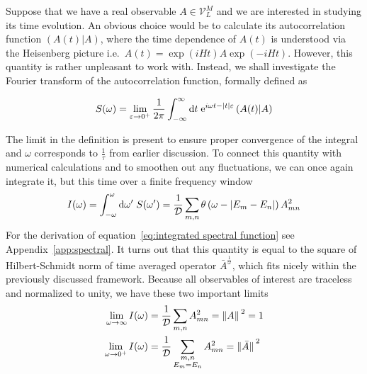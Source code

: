 Suppose that we have a real observable \(A \in \mathcal{V}_L^M\) and we are interested in studying its time
evolution. An obvious choice would be to calculate its autocorrelation function
\((A(t)|A)\), where the time dependence of \(A(t)\) is understood
via the Heisenberg picture i.e.\ \(A(t) = \exp\left(i H t\right) A
\exp\left(-i H t\right)\). However, this quantity is rather unpleasant to work with.
Instead, we shall investigate the Fourier transform of the autocorrelation function, formally
defined as
\begin{definition}  
  \begin{equation*}
  S(\omega) =  \lim _{\varepsilon \to 0^+} \frac{1}{2 \pi} \int_{-\infty}^{\infty} \mathrm{d} t 
  \; \mathrm{e}^{i \omega t-|t| \varepsilon}\left(A(t) \middle| A\right)
  \end{equation*}
  \label{def:spectral function}
\end{definition}
The limit in the definition is present to ensure proper convergence of the integral
and \(\omega{}\) corresponds to \(\frac{1}{\tau}\) from earlier discussion.
To connect this quantity with numerical calculations and to smoothen out any fluctuations, we
can once again integrate it, but this time over a finite frequency window
\begin{equation}
  I(\omega) = \int_{-\omega}^{\omega} \mathrm{d}\omega^{\prime} \; S(\omega^{\prime}) = 
  \frac{1}{\mathcal{D}} \sum_{m,n} \theta\left(\omega - |E_m-E_n|\right) A_{mn}^2
  \label{eq:integrated spectral function}
\end{equation}
For the derivation of equation~\eqref{eq:integrated spectral function} see Appendix~\ref{app:spectral}.
It turns out that this quantity is equal to the square of Hilbert-Schmidt norm of time
averaged operator \(\bar{A}^{\frac{1}{\omega}}\), which fits nicely within the previously
discussed framework. Because all observables of interest are traceless and
normalized to unity, we have these two important limits
\begin{align}
  \lim_{\omega \to \infty } I(\omega) &= \frac{1}{\mathcal{D}}\sum_{m,n} A_{mn}^2 = \norm*{A}^2 = 1\\
  \lim_{\omega \to 0^+ } I(\omega) &= \frac{1}{\mathcal{D}} \sum_{ \substack{m,n\\E_m=E_n} } A_{mn}^2 = \norm*{\bar{A}}^2
\end{align}

